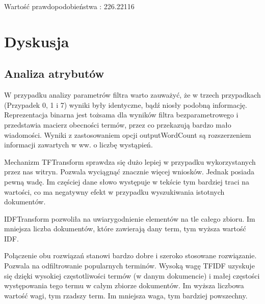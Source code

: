 \documentclass{classrep}
\begin{document}
\begin{itemize}
    \begin{table}[H]
    \centering
    \caption{Wynik analizy klastrowej dla przypadku 7.}
    \label{tab:apriori_num_params}
    \end{table}
    Wartość prawdopodobieństwa : 226.22116

    \end{itemize}
    

\section{Dyskusja}
\subsection{Analiza atrybutów}
    W przypadku analizy parametrów filtra warto zauważyć, że w trzech przypadkach (Przypadek 0, 1 i 7) wyniki były identyczne, bądź  niosły podobną informację. Reprezentacja binarna jest tożsama dla wyników filtra bezparametrowego i przedstawia macierz obecności termów, przez co przekazują bardzo mało wiadomości. Wyniki z zastosowaniem opcji outputWordCount są rozszerzeniem informacji zawartych w ww. o liczbę wystąpień.
    
    Mechanizm TFTransform sprawdza się dużo lepiej w przypadku wykorzystanych przez nas witryn. Pozwala wyciągnąć znacznie więcej wniosków. Jednak posiada pewną wadę. Im częściej dane słowo występuje w tekście tym bardziej traci na wartości, co ma negatywny efekt w przypadku wyszukiwania istotnych dokumentów.
    
    IDFTransform pozwoliła na uwiarygodnienie elementów na tle całego zbioru. Im mniejsza liczba dokumentów, które zawierają dany term, tym wyższa wartość IDF.
    
    Połączenie obu rozwiązań stanowi bardzo dobre i szeroko stosowane rozwiązanie. Pozwala na odfiltrowanie popularnych terminów.
    Wysoką wagę TFIDF uzyskuje się dzięki wysokiej częstotliwości termów (w danym dokumencie) i małej częstości występowania tego termu w całym zbiorze dokumentów. Im wyższa liczbowa wartość wagi, tym rzadszy term. Im mniejsza waga, tym bardziej powszechny. 
    
\end{document}
